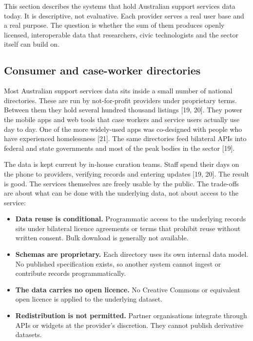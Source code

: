 \documentclass[11pt,a4paper]{article}
\begin{document}
This section describes the systems that hold Australian support services data today. It is descriptive, not evaluative. Each provider serves a real user base and a real purpose. The question is whether the sum of them produces openly licensed, interoperable data that researchers, civic technologists and the sector itself can build on.

\subsection{Consumer and case-worker directories}

Most Australian support services data sits inside a small number of national directories. These are run by not-for-profit providers under proprietary terms. Between them they hold several hundred thousand listings [19, 20]. They power the mobile apps and web tools that case workers and service users actually use day to day. One of the more widely-used apps was co-designed with people who have experienced homelessness [21]. The same directories feed bilateral APIs into federal and state governments and most of the peak bodies in the sector [19].

The data is kept current by in-house curation teams. Staff spend their days on the phone to providers, verifying records and entering updates [19, 20]. The result is good. The services themselves are freely usable by the public. The trade-offs are about what can be done with the underlying data, not about access to the service:

\begin{itemize}[nosep]
    \item \textbf{Data reuse is conditional.} Programmatic access to the underlying records sits under bilateral licence agreements or terms that prohibit reuse without written consent. Bulk download is generally not available.
    \item \textbf{Schemas are proprietary.} Each directory uses its own internal data model. No published specification exists, so another system cannot ingest or contribute records programmatically.
    \item \textbf{The data carries no open licence.} No Creative Commons or equivalent open licence is applied to the underlying dataset.
    \item \textbf{Redistribution is not permitted.} Partner organisations integrate through APIs or widgets at the provider's discretion. They cannot publish derivative datasets.
\end{itemize}
\end{document}

